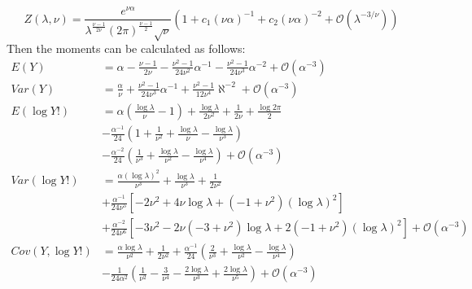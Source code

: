 \documentclass[]{article}
\begin{document}
\begin{appendices}
		\begin{equation}
			Z(\lambda, \nu)=\frac{e^{\nu\alpha}}{\lambda^{\frac{\nu-1}{2\nu}}(2\pi)^\frac{\nu-1}{2}\sqrt{\nu}}(1+c_1(\nu\alpha)^{-1} + c_2(\nu\alpha)^{-2} + \mathcal{O}(\lambda^{-3/\nu}))
		\end{equation}
		Then the moments can be calculated as follows:
		\begin{align}
			E(Y) &= \alpha - \frac{\nu-1}{2\nu} - \frac{\nu^2-1}{24\nu^2}\alpha^{-1}-\frac{\nu^2-1}{24\nu^3}\alpha^{-2} + \mathcal{O}(\alpha^{-3})\\
			Var(Y) &= \frac{\alpha}{\nu} + \frac{\nu^2-1}{24\nu^3}\alpha^{-1} + \frac{\nu^2-1}{12\nu^4}\aleph^{-2} + \mathcal{O}(\alpha^{-3}) \nonumber\\
			E(\log Y!) &= \alpha\left(\frac{\log\lambda}{\nu} - 1\right) + \frac{\log\lambda}{2\nu^2} + \frac{1}{2\nu} + \frac{\log 2\pi}{2} \nonumber \\
			&- \frac{\alpha^{-1}}{24}\left(1 + \frac{1}{\nu^2} + \frac{\log\lambda}{\nu} - \frac{\log\lambda}{\nu^3}\right) \nonumber\\
			&- \frac{\alpha^{-2}}{24}\left(\frac{1}{\nu^3} + \frac{\log\lambda}{\nu^2} - \frac{\log \lambda}{\nu^4}\right) + \mathcal{O}(\alpha^{-3}) \nonumber \\
			Var(\log Y!) &= \frac{\alpha(\log\lambda)^2}{\nu^3} + \frac{\log\lambda}{\nu^3} + \frac{1}{2\nu^2} \nonumber\\
			&+ \frac{\alpha^{-1}}{24\nu^5}[-2\nu^2 + 4\nu\log\lambda + (-1 + \nu^2)(\log\lambda)^2] \nonumber\\
			&+ \frac{\alpha^{-2}}{24\nu^6}[-3\nu^2 - 2\nu(-3 + \nu^2)\log\lambda + 2(-1 + \nu^2)(\log\lambda)^2] + \mathcal{O}(\alpha^{-3}) \nonumber \\
			Cov(Y, \log Y!) &= \frac{\alpha\log\lambda}{\nu^2} + \frac{1}{2\nu^2} + \frac{\alpha^{-1}}{24}\left(\frac{2}{\nu^3} + \frac{\log\lambda}{\nu^2} - \frac{\log\lambda}{\nu^4}\right) \nonumber\\
			&-\frac{1}{24\alpha^2}\left(\frac{1}{\nu^2} - \frac{3}{\nu^4} - \frac{2\log\lambda}{\nu^3} + \frac{2\log\lambda}{\nu^5}\right) + \mathcal{O}(\alpha^{-3}) \nonumber
		\end{align}
		
		

\end{appendices}
\end{document}
